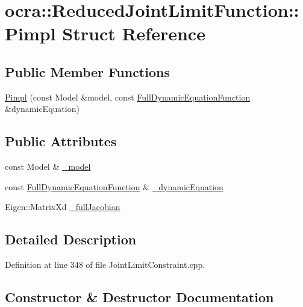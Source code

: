 \hypertarget{structReducedJointLimitFunction_1_1Pimpl}{}\section{ocra\+:\+:Reduced\+Joint\+Limit\+Function\+:\+:Pimpl Struct Reference}
\label{structReducedJointLimitFunction_1_1Pimpl}
\subsection*{Public Member Functions}
\begin{DoxyCompactItemize}
\item 
\hyperlink{structReducedJointLimitFunction_1_1Pimpl_a144b5331a7812ad5859215d57f8fd250}{Pimpl} (const Model \&model, const \hyperlink{classocra_1_1FullDynamicEquationFunction}{Full\+Dynamic\+Equation\+Function} \&dynamic\+Equation)
\end{DoxyCompactItemize}
\subsection*{Public Attributes}
\begin{DoxyCompactItemize}
\item 
const Model \& \hyperlink{structReducedJointLimitFunction_1_1Pimpl_abe6f625fec9bf8cff9f847bde9eb9ee2}{\+\_\+model}
\item 
const \hyperlink{classocra_1_1FullDynamicEquationFunction}{Full\+Dynamic\+Equation\+Function} \& \hyperlink{structReducedJointLimitFunction_1_1Pimpl_ad483380d3fcdd2da03a85d22947cf31d}{\+\_\+dynamic\+Equation}
\item 
Eigen\+::\+Matrix\+Xd \hyperlink{structReducedJointLimitFunction_1_1Pimpl_ae45e80b72fb13b54452c6ce9fe9e3798}{\+\_\+full\+Jacobian}
\end{DoxyCompactItemize}


\subsection{Detailed Description}


Definition at line 348 of file Joint\+Limit\+Constraint.\+cpp.



\subsection{Constructor \& Destructor Documentation}
\hypertarget{structReducedJointLimitFunction_1_1Pimpl_a144b5331a7812ad5859215d57f8fd250}{}\label{structReducedJointLimitFunction_1_1Pimpl_a144b5331a7812ad5859215d57f8fd250} 

